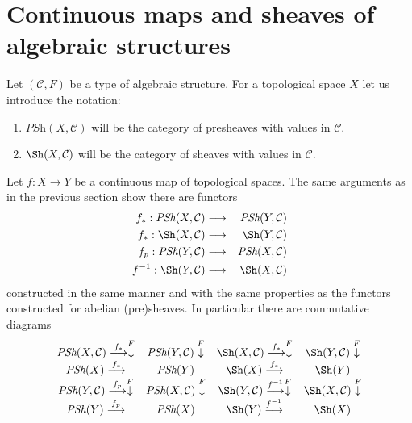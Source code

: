 \section{Continuous maps and sheaves of algebraic structures}
\label{sheaves-section-presheaves-structures-functorial}
Let $(\mathcal{C}, F)$ be a type of algebraic structure.
For a topological space $X$ let us introduce the notation:
\begin{enumerate}
\item $\textit{PSh}(X, \mathcal{C})$ will be the category
of presheaves with values in $\mathcal{C}$.
\item $\Sh(X, \mathcal{C})$ will be the category
of sheaves with values in $\mathcal{C}$.
\end{enumerate}
Let $f : X \to Y$ be a continuous map of topological spaces.
The same arguments as in the previous section show
there are functors
\begin{eqnarray*}
f_* : \textit{PSh}(X, \mathcal{C}) &
\longrightarrow &
\textit{PSh}(Y, \mathcal{C}) \\
f_* : \Sh(X, \mathcal{C}) &
\longrightarrow &
\Sh(Y, \mathcal{C}) \\
f_p : \textit{PSh}(Y, \mathcal{C}) &
\longrightarrow &
\textit{PSh}(X, \mathcal{C}) \\
f^{-1} : \Sh(Y, \mathcal{C}) &
\longrightarrow &
\Sh(X, \mathcal{C})
\end{eqnarray*}
constructed in the same manner and with the same
properties as the functors constructed for abelian
(pre)sheaves. In particular there are commutative diagrams
$$
\begin{array}{cccc}\textit{PSh}(X, \mathcal{C}) \overset{f_*}{\longrightarrow}\overset{F}{\downarrow} & \textit{PSh}(Y, \mathcal{C}) \overset{F}{\downarrow} & \Sh(X, \mathcal{C}) \overset{f_*}{\longrightarrow}\overset{F}{\downarrow} & \Sh(Y, \mathcal{C}) \overset{F}{\downarrow} \\ \textit{PSh}(X) \overset{f_*}{\longrightarrow} & \textit{PSh}(Y) & \Sh(X) \overset{f_*}{\longrightarrow} & \Sh(Y) \\ \textit{PSh}(Y, \mathcal{C}) \overset{f_p}{\longrightarrow}\overset{F}{\downarrow} & \textit{PSh}(X, \mathcal{C}) \overset{F}{\downarrow} & \Sh(Y, \mathcal{C}) \overset{f^{-1}}{\longrightarrow}\overset{F}{\downarrow} & \Sh(X, \mathcal{C}) \overset{F}{\downarrow} \\ \textit{PSh}(Y) \overset{f_p}{\longrightarrow} & \textit{PSh}(X) & \Sh(Y) \overset{f^{-1}}{\longrightarrow} & \Sh(X)\end{array}
$$

